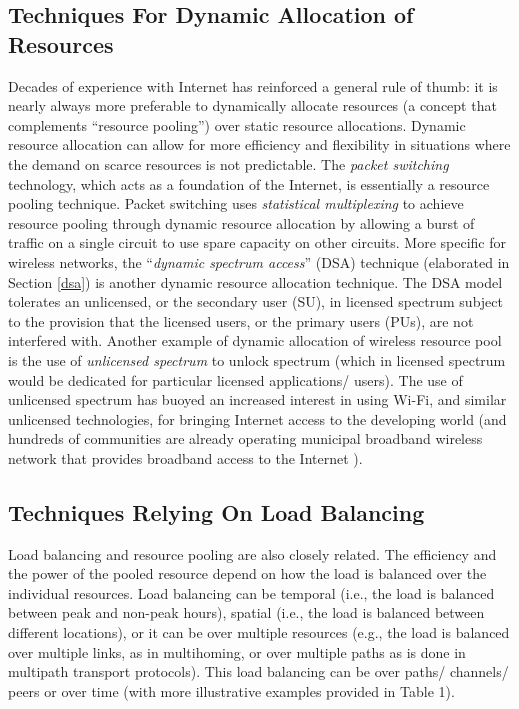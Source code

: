 \documentclass{sigcomm-alternate}
\begin{document}
\subsection{Techniques For Dynamic Allocation of Resources}



Decades of experience with Internet has reinforced a general rule of thumb: it is nearly always more preferable to dynamically allocate resources (a concept that complements ``resource pooling'') over static resource allocations. Dynamic resource allocation can allow for more efficiency and flexibility in situations where the demand on scarce resources is not predictable. The \textit{packet switching} technology, which acts as a foundation of the Internet, is essentially a resource pooling technique. Packet switching uses \textit{statistical multiplexing} to achieve resource pooling through dynamic resource allocation by allowing a burst of traffic on a single circuit to use spare capacity on other circuits. More specific for wireless networks, the ``\textit{dynamic spectrum access}'' (DSA) technique (elaborated in Section \ref{dsa}) is another dynamic resource allocation technique. The DSA model tolerates an unlicensed, or the secondary user (SU), in licensed spectrum subject to the provision that the licensed users, or the primary users (PUs), are not interfered with. Another example of dynamic allocation of wireless resource pool is the use of \textit{unlicensed spectrum} to unlock spectrum (which in licensed spectrum would be dedicated for particular licensed applications/ users). The use of unlicensed spectrum has buoyed an increased interest in using Wi-Fi, and similar unlicensed technologies, for bringing Internet access to the developing world (and hundreds of communities are already operating municipal broadband wireless network that provides broadband access to the Internet \cite{mandviwalla2008municipal}). 












\subsection{Techniques Relying On Load Balancing}

Load balancing and resource pooling are also closely related. The efficiency and the power of the pooled resource depend on how the load is balanced over the individual resources. Load balancing can be temporal (i.e., the load is balanced between peak and non-peak hours), spatial (i.e., the load is balanced between different locations), or it can be over multiple resources (e.g., the load is balanced over multiple links, as in multihoming, or over multiple paths as is done in multipath transport protocols). This load balancing can be over paths/ channels/ peers or over time (with more illustrative examples provided in Table 1).
\end{document}
